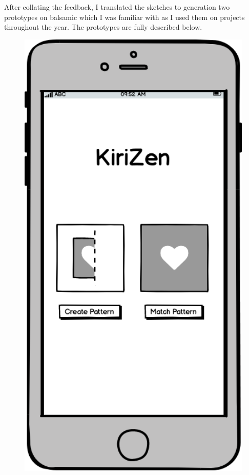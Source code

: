 \documentclass[11pt]{article}
\begin{document}
        After collating the feedback, I translated the sketches to generation two prototypes on balsamic %
        which I was familiar with as I used them on projects throughout the year. The prototypes are fully described below. 
    
\clearpage
             \begin{figure}
                \begin{minipage}[c]{0.35\textwidth}
                \includegraphics[width=1\textwidth]{Images/Prototype/prototypeHomeScreen.png}

\end{minipage}
\end{figure}
\end{document}
